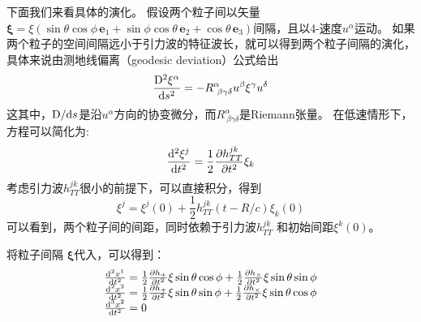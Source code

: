 下面我们来看具体的演化。
假设两个粒子间以矢量 $\boldsymbol{\xi} = \xi(\sin\theta \cos \phi \,\mathbf{e}_1+\sin\phi\cos \theta \, \mathbf{e}_2+\cos \theta  \,\mathbf{e}_3)$间隔，且以4-速度$u^\alpha$运动。
如果两个粒子的空间间隔远小于引力波的特征波长，就可以得到两个粒子间隔的演化，具体来说由测地线偏离（geodesic deviation）公式给出
\begin{equation}\label{eq:GW2particle} 
  \frac{{\rm D}^2 \xi^\alpha}{{\rm d}s^2} = -R ^{\alpha} _{~\beta\gamma\delta} u^{\beta} \xi^\gamma u^\delta
\end{equation}
这其中，${\rm D}/{\rm d}s$是沿$u^\alpha$方向的协变微分，而$R ^{\alpha} _{~\beta\gamma\delta}$是Riemann张量。
在低速情形下，方程可以简化为:
\begin{equation}\label{eq:GW2particleSimp} 
  \frac{{\rm d}^2 \xi^j}{{\rm d}t^2} = \frac{1}{2}\frac{\partial h^{jk}_{TT}}{\partial t^2 } \xi_k
\end{equation}
考虑引力波$h^{jk}_{TT}$很小的前提下，可以直接积分，得到
\begin{equation}\label{eq:GW2particleSimp} 
  \xi^j = \xi^j (0)+\frac{1}{2}h^{jk}_{TT}(t-R/c)\xi_k(0)
\end{equation}
可以看到，两个粒子间的间距，同时依赖于引力波$h^{jk}_{TT}$ 和初始间距$\xi^k(0)$。

将粒子间隔 $\boldsymbol{\xi}$代入，可以得到：
\begin{equation}\label{eq:ParticleAcceleration}
\begin{array}{r@{}l}
  \frac{{\rm d}^2 x^1}{{\rm d}t^2} &{}= \frac{1}{2}\frac{\partial h_{+}}{\partial t^2 } \xi \sin \theta \cos \phi + \frac{1}{2}\frac{\partial h_{\times}}{\partial t^2 } \xi \sin \theta \sin \phi \\
  \frac{{\rm d}^2 x^2}{{\rm d}t^2} &{}= \frac{1}{2}\frac{\partial h_{+}}{\partial t^2 } \xi \sin \theta \sin \phi + \frac{1}{2}\frac{\partial h_{\times}}{\partial t^2 } \xi \sin \theta \cos \phi \\
   \frac{{\rm d}^3 x^2}{{\rm d}t^2} &{}=  0
\end{array}
\end{equation}
